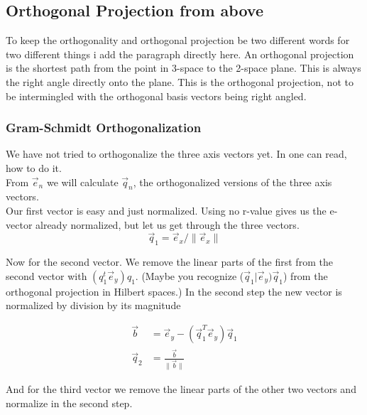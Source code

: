 \documentclass[a4paper]{article}
\begin{document}
\begin{Example}
\begin{PropositionOpt4}
\subsection{Orthogonal Projection from above}

To keep the orthogonality and orthogonal projection be two different words for two different things i add the paragraph directly here. An orthogonal projection is the shortest path from the point in 3-space to the 2-space plane. This is always the right angle directly onto the plane. This is the orthogonal projection, not to be intermingled with the orthogonal basis vectors being right angled. 

\subsubsection{Gram-Schmidt Orthogonalization}
\label{gram_schmidt_excercise}
We have not tried to orthogonalize the three axis vectors yet. In \cite{Strang1} one can read, how to do it.\\

From $\vec{e}_{n}$ we will calculate $\vec{q}_{n}$, the orthogonalized versions of the three axis vectors.\\

Our first vector is easy and just normalized. Using no r-value gives us the e-vector already normalized, but let us get through the three vectors.\\

\begin{displaymath}
\vec{q}_1 = \vec{e}_{x}/\|\vec{e}_{x}\|
\end{displaymath}

Now for the second vector. We remove the linear parts of the first from the second vector with $(q_{1}^{t}\vec{e}_{y})q_{1}$. (Maybe you recognize ($\vec{q}_{1}|\vec{e}_{y})\vec{q}_{1}$) from the orthogonal projection in Hilbert spaces.) In the second step the new vector is normalized by division by its magnitude

\begin{displaymath}
\begin{align}
\vec{b} &= \vec{e}_y - (\vec{q}_{1}^{T}\vec{e}_{y})\vec{q}_{1}\\
\vec{q}_{2} &= \frac{\vec{b}}{\|\vec{b}\|}
\end{align}
\end{displaymath}

And for the third vector we remove the linear parts of the other two vectors and normalize in the second step.


\end{PropositionOpt4}
\end{Example}
\end{document}
